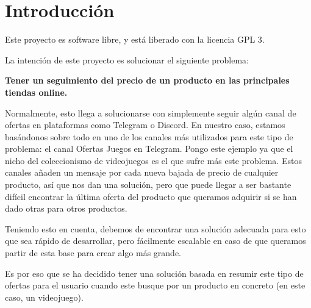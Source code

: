 \chapter{Introducción}

Este proyecto es software libre, y está liberado con la licencia GPL 3\cite{gplv3}.

La intención de este proyecto es solucionar el siguiente problema:

\textbf{Tener un seguimiento del precio de un producto en las principales tiendas online.}

Normalmente, esto llega a solucionarse con simplemente seguir algún canal de ofertas en plataformas como Telegram o Discord.
En nuestro caso, estamos basándonos sobre todo en uno de los canales más utilizados para este tipo de problema: el canal Ofertas Juegos en Telegram.
Pongo este ejemplo ya que el nicho del coleccionismo de videojuegos es el que sufre más este problema.
Estos canales añaden un mensaje por cada nueva bajada de precio de cualquier producto, así que nos dan una solución, pero que puede llegar a ser
bastante difícil encontrar la última oferta del producto que queramos adquirir si se han dado otras para otros productos.

Teniendo esto en cuenta, debemos de encontrar una solución adecuada para esto que sea rápido de desarrollar, pero fácilmente escalable en
caso de que queramos partir de esta base para crear algo más grande.

Es por eso que se ha decidido tener una solución basada en resumir este tipo de ofertas para el usuario cuando este busque por un producto en concreto (en este caso,
un videojuego).
